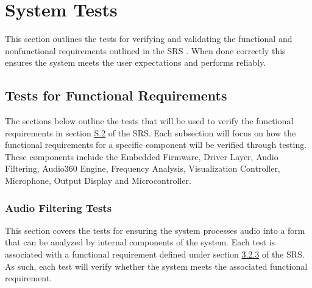 \documentclass[12pt, titlepage]{article}
\begin{document}





\section{System Tests}

This section outlines the tests for verifying and validating the functional and 
nonfunctional requirements outlined in the SRS \citep{SRS}. When done correctly 
this ensures the system meets the user expectations and performs reliably. 

\subsection{Tests for Functional Requirements}

The sections below outline the tests that will be used to verify the functional 
requirements in section \hyperref[SRS-sec:S.2]{S.2} of the SRS. Each subsection 
will focus on how the functional requirements for a specific component will be 
verified through testing. These components include the Embedded Firmware, 
Driver Layer, Audio Filtering, Audio360 Engine, Frequency Analysis, 
Visualization Controller, Microphone, Output Display and Microcontroller. 

\subsubsection{Audio Filtering Tests}

This section covers the tests for ensuring the system processes audio into a 
form that can be analyzed by internal components of the system. Each test is 
associated with a functional requirement defined under section 
\hyperref[SRS-sec:FR3]{3.2.3} of the SRS. As such, each test will verify whether
 the system meets the associated functional requirement. 
\end{document}
